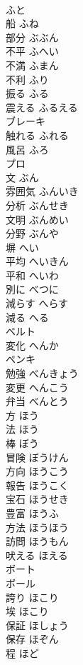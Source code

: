 \documentclass[8pt]{extreport}
\begin{document}
\begin{CJK}{UTF8}{min}
\\	ふと		
\\	船	ふね	
\\	部分	ぶぶん	
\\	不平	ふへい	
\\	不満	ふまん	
\\	不利	ふり	
\\	振る	ふる	
\\	震える	ふるえる	
\\	ブレーキ		
\\	触れる	ふれる	
\\	風呂	ふろ	
\\	プロ		
\\	文	ぶん	
\\	雰囲気	ふんいき	
\\	分析	ぶんせき	
\\	文明	ぶんめい	
\\	分野	ぶんや	
\\	塀	へい	
\\	平均	へいきん	
\\	平和	へいわ	
\\	別に	べつに	
\\	減らす	へらす	
\\	減る	へる	
\\	ベルト		
\\	変化	へんか	
\\	ペンキ		
\\	勉強	べんきょう	
\\	変更	へんこう	
\\	弁当	べんとう	
\\	方	ほう	
\\	法	ほう	
\\	棒	ぼう	
\\	冒険	ぼうけん	
\\	方向	ほうこう	
\\	報告	ほうこく	
\\	宝石	ほうせき	
\\	豊富	ほうふ	
\\	方法	ほうほう	
\\	訪問	ほうもん	
\\	吠える	ほえる	
\\	ボート		
\\	ボール		
\\	誇り	ほこり	
\\	埃	ほこり	
\\	保証	ほしょう	
\\	保存	ほぞん	
\\	程	ほど	

\end{CJK}
\end{document}

